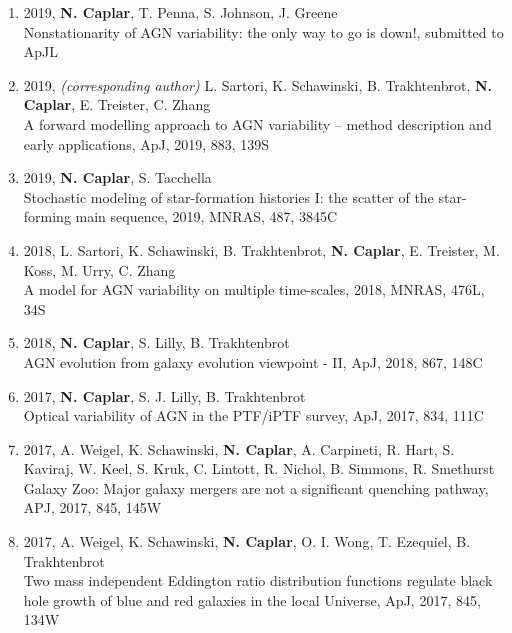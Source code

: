 \documentclass[11pt,letterpaper]{article}
\begin{document}
\begin{enumerate}



\item 2019, \textbf{N. Caplar}, T. Penna, S. Johnson, J. Greene \\
Nonstationarity of AGN variability: the only way to go is down!, submitted to ApJL\\

\item 2019, \textit{(corresponding author)} L. Sartori, K. Schawinski, B. Trakhtenbrot, \textbf{N. Caplar}, E. Treister, C. Zhang\\
A forward modelling approach to AGN variability – method
description and early applications, ApJ, 2019, 883, 139S\\


\item 2019, \textbf{N. Caplar}, S. Tacchella \\
Stochastic modeling of star-formation histories I: the scatter of the star-forming main sequence, 2019, MNRAS, 487, 3845C\\


\item 2018, L. Sartori, K. Schawinski, B. Trakhtenbrot, \textbf{N. Caplar}, E. Treister, M. Koss, M. Urry, C. Zhang \\
A model for AGN variability on multiple time-scales, 2018, MNRAS, 476L, 34S\\

\item 2018, \textbf{N. Caplar}, S. Lilly, B. Trakhtenbrot\\
AGN evolution from galaxy evolution viewpoint - II, ApJ, 2018, 867, 148C\\

\item 2017,  \textbf{N. Caplar}, S. J. Lilly, B. Trakhtenbrot   \\Optical variability of AGN in the PTF/iPTF survey, ApJ, 2017, 834, 111C   \\

\item 2017, A. Weigel, K. Schawinski,  \textbf{N. Caplar}, A. Carpineti, R. Hart, S. Kaviraj, W. Keel, S. Kruk, C. Lintott, R. Nichol, B. Simmons, R. Smethurst
\\    Galaxy Zoo:  Major galaxy mergers are not a significant quenching pathway, APJ, 2017, 845, 145W \\

\item 2017, A. Weigel, K. Schawinski,  \textbf{N. Caplar}, O. I. Wong, T. Ezequiel, B. Trakhtenbrot
\\    Two mass independent Eddington ratio distribution functions regulate black hole growth of blue and red 
galaxies in the local Universe, ApJ, 2017, 845, 134W \\



\end{enumerate}
\end{document}
